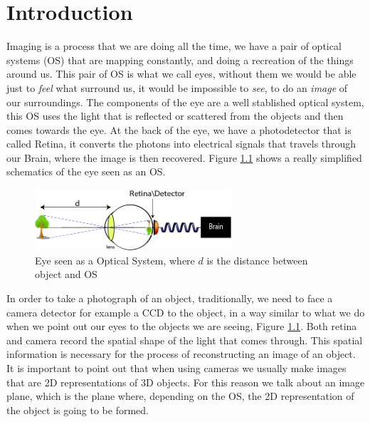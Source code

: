 
\chapter{Introduction} %

\label{Chapter1} %

Imaging is a process that we are doing all the time, we have a pair of optical systems (OS) that are mapping
constantly, and doing a recreation of the things around us. This pair of OS is what we call eyes, 
without them we would be able just to \textit{feel} what surround us, it would be impossible to \textit{see}, to do an
\textit{image} of our surroundings. The components of the eye are a well stablished optical system, this OS 
uses the light that is reflected or scattered from the objects and then comes towards the eye. At the
back of the eye, we have a photodetector that is called Retina, it converts the photons into electrical
signals that travels through our Brain, where the image is then recovered. Figure \ref{fig:eye} shows a really 
simplified schematics of the eye seen as an OS.

\begin{figure}[h!]
\centering
 \includegraphics[width=0.65\textwidth]{Figures/eye.png}
 \caption{Eye seen as a Optical System, where $d$ is the distance between object and OS} 
\label{fig:eye}
\end{figure}


In order to take a photograph of an object, traditionally, we need to face a camera detector for example a CCD to the object, 
in a way similar to what we do when we point out our eyes to the objects we are seeing, Figure \ref{fig:eye}.
Both retina and camera record the spatial shape of the light that comes through.
This spatial information is necessary for the process of reconstructing an image of an object. 
It is important to point out that when using cameras we usually make images that are 2D representations of 3D objects. For this
reason we talk about an image plane, which is the plane where, depending on the OS, the 2D representation
of the object is going to be formed. 


